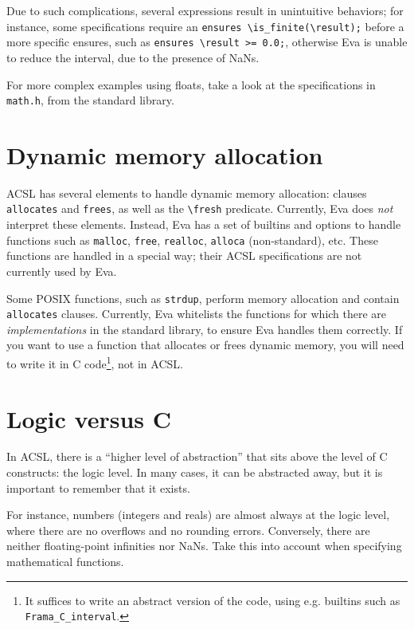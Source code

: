 \documentclass[web]{frama-c-book}
\newcommand{\Eva}{\textsf{Eva}}
\begin{document}
Due to such complications, several expressions result in unintuitive behaviors;
for instance, some specifications require an
\verb+ensures \is_finite(\result);+ before a more specific ensures, such as
\verb+ensures \result >= 0.0;+, otherwise \Eva{} is unable to reduce the interval,
due to the presence of NaNs.

For more complex examples using floats, take a look at the specifications in
\texttt{math.h}, from the \FramaC standard library.

\section{Dynamic memory allocation}

ACSL has several elements to handle dynamic memory allocation: clauses
\verb+allocates+ and \verb+frees+, as well as the \verb+\fresh+ predicate.
Currently, \Eva{} does {\em not} interpret these elements. Instead, \Eva{} has a set
of builtins and options to handle functions such as \texttt{malloc},
\texttt{free}, \texttt{realloc}, \texttt{alloca} (non-standard), etc.
These functions are handled in a special way; their ACSL specifications are not
currently used by \Eva{}.

Some POSIX functions, such as \texttt{strdup}, perform memory allocation and
contain \texttt{allocates} clauses. Currently, \Eva{} whitelists the functions
for which there are {\em implementations} in the \FramaC standard library,
to ensure \Eva{} handles them correctly. If you want to use a function that
allocates or frees dynamic memory, you will need to write it in C
code\footnote{It suffices to write an abstract version of the code, using
e.g. \FramaC builtins such as \texttt{Frama\_C\_interval}.}, not in ACSL.

\section{Logic versus C}
\label{sec:acsl-guide-logic}

In ACSL, there is a ``higher level of abstraction'' that sits above the level
of C constructs: the logic level. In many cases, it can be abstracted away,
but it is important to remember that it exists.

For instance, numbers (integers and reals) are almost always at the logic
level, where there are no overflows and no rounding errors. Conversely,
there are neither floating-point infinities nor NaNs. Take this into account
when specifying mathematical functions.
\end{document}
